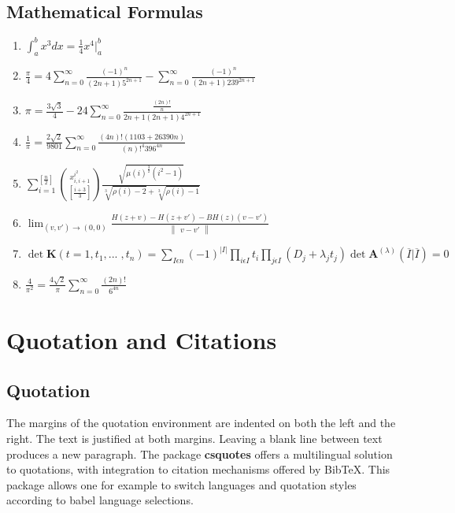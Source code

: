 \documentclass{article}
\begin{document}
\subsection{Mathematical Formulas}
\begin{enumerate}[label=\arabic*.]
    \item $ \int_{a}^{b}x^{3}dx= \frac{1}{4}x^{4}\bigg\vert_{a}^b$
    \item $ \frac{\pi}{4}=4\sum_{n=0}^{\infty}\frac{\left ( -1 \right )^{n}}{\left ( 2n+1 \right )5^{2n+1}}-\sum_{n=0}^{\infty}\frac{\left ( -1 \right )^{n}}{\left ( 2n+1 \right )239^{2n+1}}$
    \item $ \pi = \frac{3\sqrt{3}}{4} - 24 \sum_{n=0}^{\infty}\frac{\frac{\left ( 2n \right )!}{n}}{2n+1\left ( 2n+1 \right )4^{2n+1}}$
    \item $ \frac{1}{\pi}=\frac{2\sqrt{2}}{9801}\sum_{n=0}^{\infty}\frac{\left ( 4n \right )!\left ( 1103+26390n \right )}{\left ( n \right )!^{4}396^{4n}}$
    \item $ \sum_{i=1}^{[\frac{n}{2}]}\binom{x^{i^{2}}_{i,i+1}}{[\frac{i+3}{3}]}\frac{\sqrt{\mu \left ( i \right )^{\frac{3}{2}}\left ( i^{2}-1 \right )}}{\sqrt[3]{\rho\left ( i \right )-2}+\sqrt[3]{\rho \left ( i \right )-1}}$
    \item $ \lim_{\left (v,{v }'  \right )\rightarrow \left ( 0,0 \right )}\frac{H\left ( z+v \right )-H\left ( z+{v}' \right )-BH\left ( z \right )\left ( v- {v}'\right )}{\begin{Vmatrix}v-{v}'\end{Vmatrix}}$
    \item $ \det \textbf{K}\left ( t=1,t_1,...\;,t_n \right ) = \sum_{I\epsilon n}\left ( -1 \right )^{|I|}\prod_{i\epsilon I}t_i\prod_{j\epsilon I}\left ( D_j + \lambda_jt_j \right )\det \textbf{A}^{\left ( \lambda \right )}\left ( \overline{I}|\overline{I} \right )=0 $
    \item $ \frac{4}{\pi^{2}}=\frac{4\sqrt{2}}{\pi}\sum_{n=0}^{\infty}\frac{\left ( 2n \right )!}{6^{4n}}$
\end{enumerate}

\section{Quotation and Citations}
\subsection{Quotation}
The margins of the quotation environment are indented on both the left and the right. The text is justified at both margins. Leaving a blank line between text produces a new paragraph. The package \textbf{csquotes} offers a multilingual solution to quotations, with integration to citation mechanisms offered by BibTeX. This package allows one for example to switch languages and quotation styles according to babel language selections.
\end{document}

